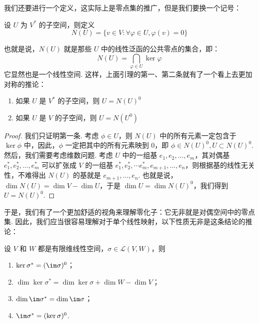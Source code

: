 我们还要进行一个定义，这实际上是零点集的推广，但是我们要换一个记号：

\begin{definition}{}{}
    设 $U$ 为 $V^*$ 的子空间，则定义
    \[
        N(U) = \{v \in V: \forall \varphi \in U, \varphi(v) = 0\}
    \]
\end{definition}

也就是说，$N(U)$ 就是那些 $U$ 中的线性泛函的公共零点的集合，即：
\[
    N(U) = \bigcap_{\varphi \in U} \ker \varphi
\]
它显然也是一个线性空间. 这样，上面引理的第一、第二条就有了一个看上去更加对称的推论：

\begin{lemma}{}{}
    \begin{enumerate}
        \item 如果 $U$ 是 $V^*$ 的子空间，则 $U = N(U)^0$
        \item 如果 $U$ 是 $V$ 的子空间，则 $U = N(U^0)$
    \end{enumerate}
\end{lemma}

\begin{proof}
    我们只证明第一条. 考虑 $\phi \in U$，则 $N(U)$ 中的所有元素一定包含于 $\ker \phi$ 中，因此，$\phi$ 一定把其中的所有元素映到 $0$，即 $\phi \in N(U)^0, U \subset N(U)^0$. 然后，我们需要考虑维数问题. 考虑 $U$ 中的一组基 $e_1, e_2,\ldots, e_m$，其对偶基 $e_1^*, e_2^*, ..., e_m^*$ 可以扩张成 $V$ 的一组基 $e_1^*, e_2^*, \cdots e_m^*, e_{m + 1},\ldots, e_n$，则根据基的线性无关性，不难得出 $N(U)$ 的基就是 $e_{m + 1},\ldots, e_n$. 也就是说，$\dim N(U) = \dim V - \dim U$，于是 $\dim U = \dim N(U)^0$，我们得到 $U = N(U)^0$.
\end{proof}

于是，我们有了一个更加舒适的视角来理解零化子：它无非就是对偶空间中的零点集. 因此，我们应当很容易理解对于单个线性映射，以下性质无非是这条结论的推论：

\begin{theorem}{}{}
    设 $V$ 和 $W$ 都是有限维线性空间，$\sigma\in\mathcal{L}(V,W)$，则
    \begin{enumerate}
        \item $\ker\sigma^*=(\im\sigma)^0$；
        \item $\dim\ker\sigma^*=\dim\ker\sigma+\dim W-\dim V$；
        \item $\dim\im\sigma^*=\dim\im\sigma$；
        \item $\im\sigma^*=(\ker\sigma)^0$.
    \end{enumerate}
\end{theorem}

